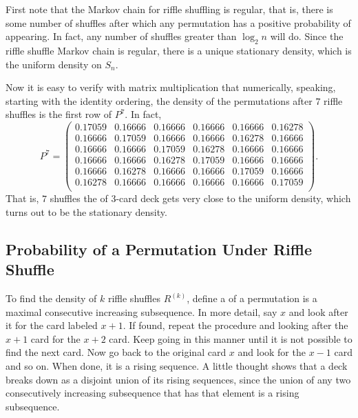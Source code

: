\documentclass[12pt]{article}
\begin{document}
First note that the Markov chain for riffle shuffling is regular, that
is, there is some number of shuffles after which any permutation has a
positive probability of appearing.  In fact, any number of shuffles
greater than \( \log_2 n \) will do.  Since the riffle shuffle Markov
chain is regular, there is a unique stationary density, which is the
uniform density on \( S_n \).

Now it is easy to verify with matrix multiplication that numerically,
speaking, starting with the identity ordering, the density of the
permutations after \( 7 \) riffle shuffles is the first row of \( P^7 \).
In fact,
\[
    P^7 =
    \begin{pmatrix}
        0.17059 & 0.16666       & 0.16666       & 0.16666       &
        0.16666 & 0.16278 \\
        0.16666 & 0.17059       & 0.16666       & 0.16666       &
        0.16278 & 0.16666 \\
        0.16666 & 0.16666       & 0.17059       & 0.16278       &
        0.16666 & 0.16666 \\
        0.16666 & 0.16666       & 0.16278       & 0.17059       &
        0.16666 & 0.16666 \\
        0.16666 & 0.16278       & 0.16666       & 0.16666       &
        0.17059 & 0.16666 \\
        0.16278 & 0.16666       & 0.16666       & 0.16666       &
        0.16666 & 0.17059 \\
    \end{pmatrix}
    .
\] That is, \( 7 \) shuffles the of 3-card deck gets very close to the
uniform density, which turns out to be the stationary density.

\subsection*{Probability of a Permutation Under Riffle Shuffle}

To find the density of \( k \) riffle shuffles \( R^{(k)} \), define a
%
of a permutation is a maximal consecutive increasing subsequence.  In
more detail, say \( x \) and look after it for the card labeled \( x+1 \).
If found, repeat the procedure and looking after the \( x+1 \) card for
the \( x+2 \) card.  Keep going in this manner until it is not possible
to find the next card.  Now go back to the original card \( x \) and
look for the \( x-1 \) card and so on.  When done, it is a rising
sequence.  A little thought shows that a deck breaks down as a disjoint
union of its rising sequences, since the union of any two consecutively
increasing subsequence that has that element is a rising subsequence.
\end{document}
